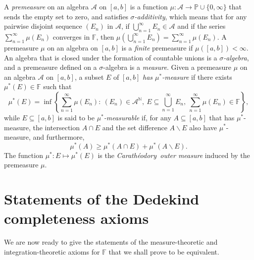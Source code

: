 \documentclass[11pt,a4paper]{article}
\def\F{\mathbb{F}}
\def\P{\mathbb{P}}
\def\N{\mathbb{N}}
\def\lbrak{\left[}
\def\rbrak{\right]}
\def\lpar{\left(}
\def\rpar{\right)}
\def\abClosed{\lbrak a,b\rbrak}
\def\into{\longrightarrow}
\def\sub{\subseteq}
\def\setdiff{\backslash}
\def\abAlg{\mathcal{A}}
\def\Cara{Carath\'{e}odory\  }
\begin{document}
A \emph{premeasure} on an algebra $\abAlg$ on $\abClosed$ is a function $\mu:\abAlg\into\P\cup\{0,\infty\}$ that sends the empty set to zero, and satisfies \emph{$\sigma$-additivity}, which means that for any pairwise disjoint sequence $(E_n)$ in $\abAlg$, if $\bigcup_{n=1}^\infty E_n\in\abAlg$ and if the series $\sum_{n=1}^\infty\mu(E_n)$ converges in $\F$, then $\mu\lpar\bigcup_{n=1}^\infty E_n\rpar=\sum_{n=1}^\infty\mu(E_n)$. A premeasure $\mu$ on an algebra on $\abClosed$ is a \emph{finite} premeasure if $\mu(\abClosed)<\infty$.  An algebra that is closed under the formation of countable unions is a \emph{$\sigma$-algebra}, and a premeasure defined on a $\sigma$-algebra is a \emph{measure}.  Given a premeasure $\mu$ on an algebra $\abAlg$ on $\abClosed$, a subset $E$ of $\abClosed$ \emph{has $\mu^*$-measure} if there exists $\mu^*(E)\in\F$ such that
\[\mu^*(E)=\inf\left\{\sum_{n=1}^\infty\mu(E_n)  :\  (E_n)\in\abAlg^\N,\ E\sub\bigcup_{n=1}^\infty E_n,\  \sum_{n=1}^\infty\mu(E_n)\in\F\right\},\]
while $E\sub\abClosed$ is said to be \emph{$\mu^*$-measurable} if, for any $A\sub\abClosed$ that has $\mu^*$-measure, the intersection $A\cap E$ and the set difference $A\setdiff E$ also have $\mu^*$-measure, and furthermore,
\[\mu^*(A)\geq\mu^*(A\cap E)+\mu^*(A\setdiff E).\]
The function $\mu^*:E\mapsto\mu^*(E)$ is the \emph{\Cara outer measure} induced by the premeasure $\mu$.



\section{Statements of the Dedekind completeness axioms}\label{StateSec}

We are now ready to give the statements of the measure-theoretic and integration-theoretic axioms for $\F$ that we shall prove to be equivalent.
\end{document}
